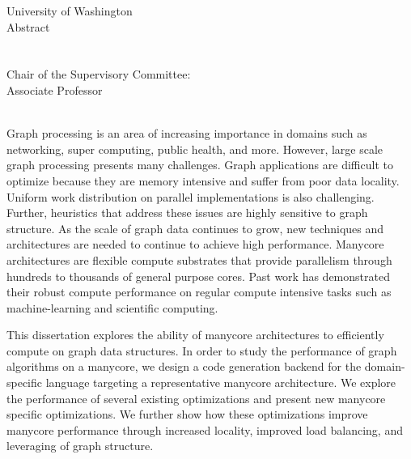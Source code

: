 \begingroup
\let\clearpage\relax
\let\cleardoublepage\relax
\let\cleardoublepage\relax

\thispagestyle{empty}
\begin{center}
    University of Washington \\ \bigskip
    Abstract \\
    \bigskip
    {\color{CTtitle}\spacedallcaps{\myTitle} \\ \bigskip
    }
    \bigskip
    \myName \\
    \bigskip
    Chair of the Supervisory Committee: \\
    Associate Professor \myChair \\
    \myDepartment \\
    \bigskip
\end{center}




\endgroup

\begin{doublespacing}
\noindent Graph processing is an area of increasing importance in domains such as networking, super computing, public health, and more.
However, large scale graph processing presents many challenges.
Graph applications are difficult to optimize because they are memory intensive and suffer from poor data locality.
Uniform work distribution on parallel implementations is also challenging.
Further, heuristics that address these issues are highly sensitive to graph structure.
As the scale of graph data continues to grow, new techniques and architectures are needed to continue to achieve high performance.
Manycore architectures are flexible compute substrates that provide parallelism through hundreds to thousands of general purpose cores.
Past work has demonstrated their robust compute performance on regular compute intensive tasks such as machine-learning and scientific computing.

This dissertation explores the ability of manycore architectures to efficiently compute on graph data structures.
In order to study the performance of graph algorithms on a manycore, we design a code generation backend for the \graphit domain-specific language targeting a representative manycore architecture.
We explore the performance of several existing optimizations and present new manycore specific optimizations.
We further show how these optimizations improve manycore performance through increased locality, improved load balancing, and leveraging of graph structure.

\end{doublespacing}

